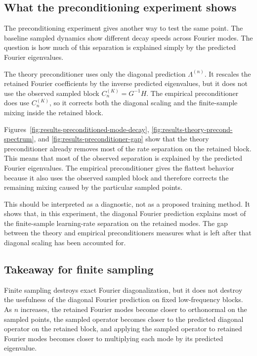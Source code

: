 \subsection{What the preconditioning experiment shows}
\label{subsec:discussion-finite-data-preconditioning}

The preconditioning experiment gives another way to test the same point. The
baseline sampled dynamics show different decay speeds across Fourier modes. The
question is how much of this separation is explained simply by the predicted
Fourier eigenvalues.

The theory preconditioner uses only the diagonal prediction
\(\Lambda^{(n)}\). It rescales the retained Fourier coefficients by the inverse
predicted eigenvalues, but it does not use the observed sampled block
\(C_n^{(K)}=G^{-1}H\). The empirical preconditioner does use
\(C_n^{(K)}\), so it corrects both the diagonal scaling and the finite-sample
mixing inside the retained block.

Figures~\ref{fig:results-preconditioned-mode-decay},
\ref{fig:results-theory-precond-spectrum}, and
\ref{fig:results-preconditioner-gap} show that the theory preconditioner already
removes most of the rate separation on the retained block. This means that most
of the observed separation is explained by the predicted Fourier eigenvalues.
The empirical preconditioner gives the flattest behavior because it also uses
the observed sampled block and therefore corrects the remaining mixing caused by
the particular sampled points.

This should be interpreted as a diagnostic, not as a proposed training method.
It shows that, in this experiment, the diagonal Fourier prediction explains most
of the finite-sample learning-rate separation on the retained modes. The gap
between the theory and empirical preconditioners measures what is left after
that diagonal scaling has been accounted for.

\subsection{Takeaway for finite sampling}
\label{subsec:discussion-finite-data-summary}

Finite sampling destroys exact Fourier diagonalization, but it does not destroy
the usefulness of the diagonal Fourier prediction on fixed low-frequency
blocks. As \(n\) increases, the retained Fourier modes become closer to
orthonormal on the sampled points, the sampled operator becomes closer to the
predicted diagonal operator on the retained block, and applying the sampled
operator to retained Fourier modes becomes closer to multiplying each mode by
its predicted eigenvalue.

